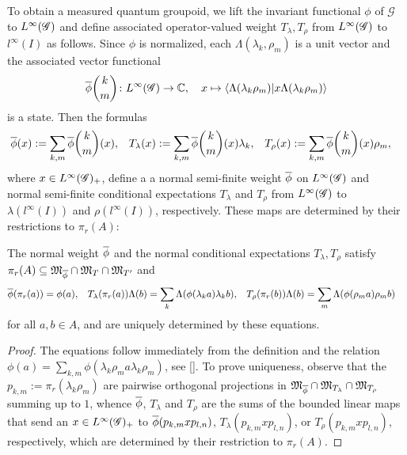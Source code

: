 To obtain a measured quantum groupoid, we lift the invariant
functional $\phi$ of $\mathscr{G}$ to $L^{\infty}(\mathscr{G})$ and define associated
operator-valued weight $T_{\lambda},T_{\rho}$ from $L^{\infty}(\mathscr{G})$ to
$l^{\infty}(I)$ as follows. Since $\phi$ is normalized, each
$\Lambda(\lambda_{k},\rho_{m})$ is a unit vector and the associated
vector functional
\begin{align*}
  \overline{\phi}{k\choose m}\colon L^{\infty}(\mathscr{G}) \to  \mathbb{C}, \quad x \mapsto \langle\Lambda(\lambda_{k}\rho_{m})|x\Lambda(\lambda_{k}\rho_{m})\rangle
\end{align*}
is a state.  Then the formulas
\begin{align} \label{eq:vn-weights}
  \overline{\phi}(x) &:= \sum_{k,m} \overline{\phi}{k\choose m}(x), &
    T_{\lambda}(x)&:= \sum_{k,m}
\overline{\phi}{k\choose m}(x)\lambda_{k}, & 
T_{\rho}(x)&:=
    \sum_{k,m} \overline{\phi}{k\choose m}(x)\rho_{m},
\end{align}
where $x\in L^{\infty}(\mathscr{G})_{+}$, define a a normal semi-finite weight $\overline{\phi}$
on $L^{\infty}(\mathscr{G})$ and normal semi-finite conditional expectations $T_{\lambda}$ and
$T_{\rho}$ from $L^{\infty}(\mathscr{G})$ to $\lambda(l^{\infty}(I))$ and
$\rho(l^{\infty}(I))$, respectively. These maps are determined by
their restrictions to $\pi_{r}(A)$:
\begin{Lem} \label{lemma:vn-weights-unique} The normal weight $\overline{\phi}$ and
  the normal conditional expectations $T_{\lambda},T_{\rho}$ satisfy $\pi_{r}(A) \subseteq
  \mathfrak{M}_{\overline{\phi}} \cap \mathfrak{M}_{T} \cap \mathfrak{M}_{T'}$
  and
  \begin{align*}
    \overline{\phi}(\pi_{r}(a))&= \phi(a), & T_{\lambda}(\pi_{r}(a))\Lambda(b) &=
    \sum_{k}\Lambda(\phi(\lambda_{k}a)\lambda_{k}b), &
    T_{\rho}(\pi_{r}(b))\Lambda(b) &= \sum_{m}\Lambda(\phi(\rho_{m}a)\rho_{m}b)
  \end{align*}
  for all $a,b\in A$, and are uniquely determined by these equations. 
\end{Lem}
\begin{proof}
  The equations follow immediately from the definition and the
  relation $\phi(a)=\sum_{k,m}
  \phi(\lambda_{k}\rho_{m}a\lambda_{k}\rho_{m})$, see \ref{}. To prove
  uniqueness, observe that the $p_{k,m}:=\pi_{r}(\lambda_{k}\rho_{m})$ are
  pairwise orthogonal projections in $\mathfrak{M}_{\overline{\phi}}
  \cap \mathfrak{M}_{T_{\lambda}} \cap \mathfrak{M}_{T_{\rho}}$
  summing up to $1$, whence $\overline{\phi}$, $T_{\lambda}$ and $T_{\rho}$ are
  the sums of the bounded linear maps that send an $x\in L^{\infty}(\mathscr{G})_{+}$
  to $\overline{\phi}(p_{k,m}xp_{l,n})$, $T_{\lambda}(p_{k,m}xp_{l,n})$, or
  $T_{\rho}(p_{k,m}xp_{l,n})$, respectively, which are determined by
  their restriction to $\pi_{r}(A)$.
\end{proof}

